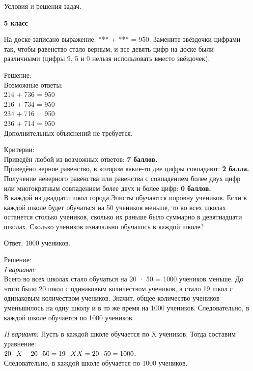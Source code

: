 \centerline{\Huge Условия и решения задач.}
\centerline{\bf \Huge 5 класс}
 
На доске записано выражение: *** + *** = 950. Замените звёздочки цифрами так, чтобы равенство стало верным, и все девять цифр на доске были различными (цифры 9, 5 и 0 нельзя использовать вместо звёздочек).

\hspace{3mm}

Решение:\\
Возможные ответы:\\
214 + 736 = 950\\
216 + 734 = 950\\
234 + 716 = 950\\
236 + 714 = 950\\
Дополнительных объяснений не требуется.

\hspace{3mm}

Критерии:\\
Приведён любой из возможных ответов: \textbf{7 баллов.}\\
Приведёно верное равенство, в котором какие-то две цифры совпадают: \textbf{2 балла.} \\
Получение неверного равенства или равенства с совпадением более двух цифр или многократным совпадением более двух и более цифр: \textbf{0 баллов.}\\


В каждой из двадцати школ города Элисты обучаются поровну учеников. Если в каждой школе будет обучаться на 50 учеников меньше, то во всех школах останется столько учеников, сколько их раньше было суммарно в девятнадцати школах. Сколько учеников изначально обучалось в каждой школе?

\hspace{3mm}

Ответ: 1000 учеников.

Решение:\\
\textit{I вариант}: \\
Всего во всех школах стало обучаться на 20 · 50 = 1000 учеников меньше. До этого было 20 школ с одинаковым количеством учеников, а стало 19 школ с одинаковым количеством учеников. Значит, общее количество учеников уменьшилось на одну школу и в то же время на 1000 учеников. Следовательно, в каждой школе обучается по 1000 учеников.

\newpage
\hspace{10mm}

\textit{II вариант}: Пусть в каждой школе обучается по X учеников. Тогда составим уравнение:\\$20\cdot X - 20\cdot50 = 19\cdot X\\
X = 20\cdot50 = 1000$. \\Следовательно, в каждой школе обучается по 1000 учеников.

